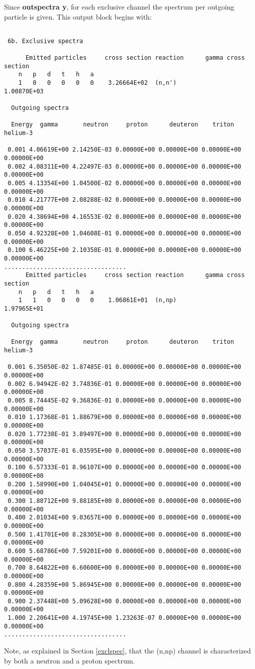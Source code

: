 \begin{samplecase}
Since {\bf outspectra y}, for each exclusive channel the spectrum per 
outgoing particle is given. This output block begins with:

{\small \begin{verbatim}

 6b. Exclusive spectra

      Emitted particles     cross section reaction      gamma cross section
    n   p   d   t   h   a
    1   0   0   0   0   0    3.26664E+02  (n,n')            1.00870E+03

  Outgoing spectra

  Energy  gamma       neutron     proton      deuteron    triton      helium-3  

 0.001 4.06619E+00 2.14250E-03 0.00000E+00 0.00000E+00 0.00000E+00 0.00000E+00
 0.002 4.08311E+00 4.22497E-03 0.00000E+00 0.00000E+00 0.00000E+00 0.00000E+00
 0.005 4.13354E+00 1.04500E-02 0.00000E+00 0.00000E+00 0.00000E+00 0.00000E+00
 0.010 4.21777E+00 2.08288E-02 0.00000E+00 0.00000E+00 0.00000E+00 0.00000E+00
 0.020 4.38694E+00 4.16553E-02 0.00000E+00 0.00000E+00 0.00000E+00 0.00000E+00
 0.050 4.92328E+00 1.04608E-01 0.00000E+00 0.00000E+00 0.00000E+00 0.00000E+00
 0.100 6.46225E+00 2.10358E-01 0.00000E+00 0.00000E+00 0.00000E+00 0.00000E+00
..................................
      Emitted particles     cross section reaction      gamma cross section
    n   p   d   t   h   a
    1   1   0   0   0   0    1.06861E+01  (n,np)            1.97965E+01
 
  Outgoing spectra
 
  Energy  gamma       neutron     proton      deuteron    triton      helium-3  
   
 0.001 6.35050E-02 1.87485E-01 0.00000E+00 0.00000E+00 0.00000E+00 0.00000E+00
 0.002 6.94942E-02 3.74836E-01 0.00000E+00 0.00000E+00 0.00000E+00 0.00000E+00
 0.005 8.74445E-02 9.36836E-01 0.00000E+00 0.00000E+00 0.00000E+00 0.00000E+00
 0.010 1.17368E-01 1.88679E+00 0.00000E+00 0.00000E+00 0.00000E+00 0.00000E+00
 0.020 1.77238E-01 3.89497E+00 0.00000E+00 0.00000E+00 0.00000E+00 0.00000E+00
 0.050 3.57037E-01 6.03595E+00 0.00000E+00 0.00000E+00 0.00000E+00 0.00000E+00
 0.100 6.57333E-01 8.96107E+00 0.00000E+00 0.00000E+00 0.00000E+00 0.00000E+00
 0.200 1.58990E+00 1.04045E+01 0.00000E+00 0.00000E+00 0.00000E+00 0.00000E+00
 0.300 1.88712E+00 9.88185E+00 0.00000E+00 0.00000E+00 0.00000E+00 0.00000E+00
 0.400 2.01034E+00 9.03657E+00 0.00000E+00 0.00000E+00 0.00000E+00 0.00000E+00
 0.500 1.41701E+00 8.28305E+00 0.00000E+00 0.00000E+00 0.00000E+00 0.00000E+00
 0.600 5.68786E+00 7.59201E+00 0.00000E+00 0.00000E+00 0.00000E+00 0.00000E+00
 0.700 8.64822E+00 6.60600E+00 0.00000E+00 0.00000E+00 0.00000E+00 0.00000E+00
 0.800 4.28359E+00 5.86945E+00 0.00000E+00 0.00000E+00 0.00000E+00 0.00000E+00
 0.900 2.37448E+00 5.09628E+00 0.00000E+00 0.00000E+00 0.00000E+00 0.00000E+00
 1.000 2.20641E+00 4.19745E+00 1.23263E-07 0.00000E+00 0.00000E+00 0.00000E+00
..................................
\end{verbatim} } \renewcommand{\baselinestretch}{1.07}\small\normalsize
\noindent
Note, as explained in Section \ref{exclspec}, that the (n,np) channel is 
characterized by both a neutron and a proton spectrum.

\end{samplecase}
